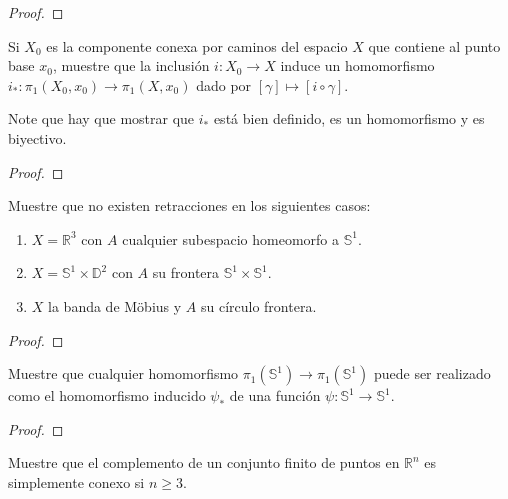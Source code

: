 \documentclass[12pt]{report}
\newcounter{it}
\theoremstyle{largebreak}
\newcommand\cf[3]{\ensuremath{#1:#2\rightarrow#3}}
\begin{document}
    \begin{proof}
        
    \end{proof}

    \begin{excer}
        Si $X_0$ es la componente conexa por caminos del espacio $X$ que contiene al punto base $x_0$, muestre que la inclusión $\cf{i}{X_0}{X}$ induce un homomorfismo $\cf{i_*}{\pi_1(X_0,x_0)}{\pi_1(X,x_0)}$ dado por $[\gamma]\mapsto[i\circ\gamma]$.

        Note que hay que mostrar que $i_*$ está bien definido, es un homomorfismo y es biyectivo.
    \end{excer}

    \begin{proof}
        
    \end{proof}

    \begin{excer}
        Muestre que no existen retracciones en los siguientes casos:
        \begin{enumerate}[label = \textit{(\alph*)}]
            \item $X=\mathbb{R}^3$ con $A$ cualquier subespacio homeomorfo a $\mathbb{S}^1$.
            \item $X=\mathbb{S}^1\times\mathbb{D}^2$ con $A$ su frontera $\mathbb{S}^1\times\mathbb{S}^1$.
            \item $X$ la banda de Möbius y $A$ su círculo frontera.
        \end{enumerate}
    \end{excer}

    \begin{proof}
        
    \end{proof}

    \begin{excer}
        Muestre que cualquier homomorfismo $\pi_1(\mathbb{S}^1)\rightarrow\pi_1(\mathbb{S}^1)$ puede ser realizado como el homomorfismo inducido $\psi_*$ de una función $\cf{\psi}{\mathbb{S}^1}{\mathbb{S}^1}$.
    \end{excer}

    \begin{proof}
        
    \end{proof}

    \begin{excer}
        Muestre que el complemento de un conjunto finito de puntos en $\mathbb{R}^n$ es simplemente conexo si $n\geq 3$.
    \end{excer}
\end{document}
